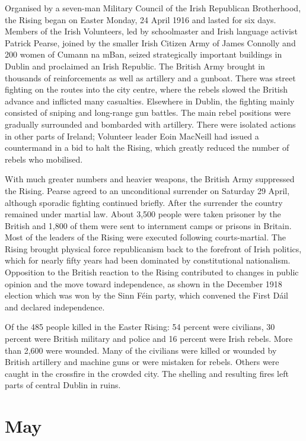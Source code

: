 \documentclass[a4paper,]{book}
\begin{document}
Organised by a seven-man Military Council of the Irish Republican Brotherhood, the Rising began on Easter Monday, 24 April 1916 and lasted for six days. Members of the Irish Volunteers, led by schoolmaster and Irish language activist Patrick Pearse, joined by the smaller Irish Citizen Army of James Connolly and 200 women of Cumann na mBan, seized strategically important buildings in Dublin and proclaimed an Irish Republic. The British Army brought in thousands of reinforcements as well as artillery and a gunboat. There was street fighting on the routes into the city centre, where the rebels slowed the British advance and inflicted many casualties. Elsewhere in Dublin, the fighting mainly consisted of sniping and long-range gun battles. The main rebel positions were gradually surrounded and bombarded with artillery. There were isolated actions in other parts of Ireland; Volunteer leader Eoin MacNeill had issued a countermand in a bid to halt the Rising, which greatly reduced the number of rebels who mobilised.

With much greater numbers and heavier weapons, the British Army suppressed the Rising. Pearse agreed to an unconditional surrender on Saturday 29 April, although sporadic fighting continued briefly. After the surrender the country remained under martial law. About 3,500 people were taken prisoner by the British and 1,800 of them were sent to internment camps or prisons in Britain. Most of the leaders of the Rising were executed following courts-martial. The Rising brought physical force republicanism back to the forefront of Irish politics, which for nearly fifty years had been dominated by constitutional nationalism. Opposition to the British reaction to the Rising contributed to changes in public opinion and the move toward independence, as shown in the December 1918 election which was won by the Sinn Féin party, which convened the First Dáil and declared independence.

Of the 485 people killed in the Easter Rising: 54 percent were civilians, 30 percent were British military and police and 16 percent were Irish rebels. More than 2,600 were wounded. Many of the civilians were killed or wounded by British artillery and machine guns or were mistaken for rebels. Others were caught in the crossfire in the crowded city. The shelling and resulting fires left parts of central Dublin in ruins. 


\chapter{May}
\end{document}

